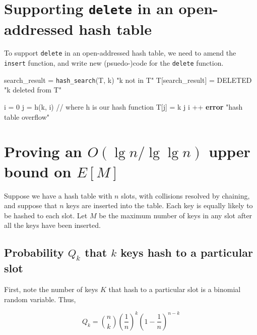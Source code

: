 \documentclass[paper=a4, fontsize=11pt]{scrartcl} %
\numberwithin{equation}{section} %
\numberwithin{figure}{section} %
\numberwithin{table}{section} %
\begin{document}
\section{Supporting \texttt{delete} in an open-addressed hash table}

To support \texttt{delete} in an open-addressed hash table, we need to amend the \texttt{insert} function, and write new (psuedo-)code for the \texttt{delete} function.

\begin{algorithmic}
	\State search\_result = \texttt{hash\_search}(T, k)
		\State \Return "k not in T"
	\Else
		\State T[search\_result] = DELETED
		\State \Return "k deleted from T"
	\EndIf
\EndFunction
\end{algorithmic}


\begin{algorithmic}
	\State i = 0
		\State j = h(k, i)   // where h is our hash function
			\State T[j] = k
			\State \Return j
		\Else
			\State i ++
		\EndIf
	\EndWhile
	\State \textbf{error} "hash table overflow"
\EndFunction
\end{algorithmic}

\section{Proving an $O(\lg n / \lg \lg n)$ upper bound on $E[M]$}

Suppose we have a hash table with $n$ slots, with collisions resolved by chaining, and suppose that $n$ keys are inserted into the table. Each key is equally likely to be hashed to each slot. Let $M$ be the maximum number of keys in any slot after all the keys have been inserted.

\subsection{Probability $Q_k$ that $k$ keys hash to a particular slot}

First, note the number of keys $K$ that hash to a particular slot is a binomial random variable. Thus,

\[Q_k = {n \choose k} \left(\frac{1}{n}\right)^k \left(1 - \frac{1}{n}\right)^{n - k}\]
\end{document}
